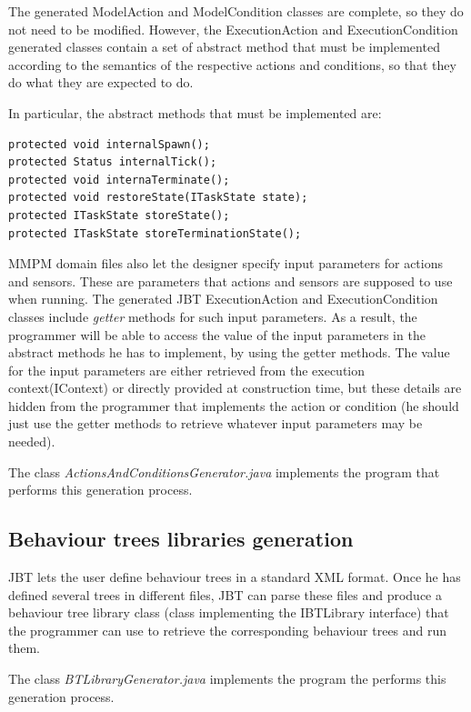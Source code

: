 \documentclass[a4paper,10pt]{article}
\begin{document}
The generated ModelAction and ModelCondition classes are complete, so they do not need to be modified. However, the ExecutionAction and ExecutionCondition generated classes contain a set of abstract method that must be implemented according to the semantics of the respective actions and conditions, so that they do what they are expected to do.

In particular, the abstract methods that must be implemented are:

\begin{verbatim}
protected void internalSpawn();
protected Status internalTick();
protected void internaTerminate();
protected void restoreState(ITaskState state);
protected ITaskState storeState();
protected ITaskState storeTerminationState(); 
\end{verbatim}

MMPM domain files also let the designer specify input parameters for actions and sensors. These are parameters that actions and sensors are supposed to use when running. The generated JBT ExecutionAction and ExecutionCondition classes include \textit{getter} methods for such input parameters. As a result, the programmer will be able to access the value of the input parameters in the abstract methods he has to implement, by using the getter methods. The value for the input parameters are either retrieved from the execution context(IContext) or directly provided at construction time, but these details are hidden from the programmer that implements the action or condition (he should just use the getter methods to retrieve whatever input parameters may be needed).

The class \textit{ActionsAndConditionsGenerator.java} implements the program that performs this generation process.

\subsection{Behaviour trees libraries generation}

JBT lets the user define behaviour trees in a standard XML format. Once he has defined several trees in different files, JBT can parse these files and produce a behaviour tree library class (class implementing the IBTLibrary interface) that the programmer can use to retrieve the corresponding behaviour trees and run them.

The class \textit{BTLibraryGenerator.java} implements the program the performs this generation process. 
\end{document}
